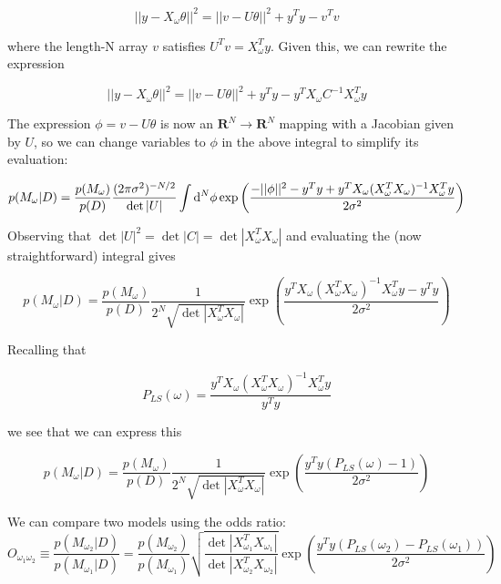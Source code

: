 \documentclass[12pt,pdftex]{article}
\begin{document}
\begin{equation}
  ||y - X_\omega\theta||^2 = ||v - U\theta||^2 + y^Ty - v^Tv
\end{equation}

where the length-N array $v$ satisfies $U^Tv = X_\omega^Ty$. Given this, we can rewrite the expression

\begin{equation}
  ||y - X_\omega\theta||^2 = ||v - U\theta||^2 + y^Ty - y^TX_\omega C^{-1}X_\omega^Ty
\end{equation}

The expression $\phi = v - U\theta$ is now an $\mathbf{R}^N\to\mathbf{R}^N$ mapping with a Jacobian given by $U$, so we can change variables to $\phi$ in the above integral to simplify its evaluation:

\begin{equation}
  p(M_\omega|D) = \frac{p(M_\omega)}{p(D)}\frac{(2\pi\sigma^2)^{-N/2}}{\det|U|}
\int{\rm d}^N\phi\exp\left(\frac{-||\phi||^2 - y^Ty + y^TX_\omega(X_\omega^TX_\omega)^{-1}X_\omega^Ty}{2\sigma^2}\right)
\end{equation}

Observing that $\det|U|^2 = \det|C| = \det|X_\omega^TX_\omega|$ and evaluating the (now straightforward) integral gives

\begin{equation}
  p(M_\omega|D) = \frac{p(M_\omega)}{p(D)}\frac{1}{2^N\sqrt{\det|X_\omega^TX_\omega|}}
  \exp\left(\frac{y^TX_\omega(X_\omega^TX_\omega)^{-1}X_\omega^Ty - y^Ty}{2\sigma^2}\right)
\end{equation}

Recalling that

\begin{equation}
  P_{LS}(\omega) = \frac{y^TX_\omega(X_\omega^TX_\omega)^{-1}X_\omega^Ty}{y^Ty}
\end{equation}

we see that we can express this

\begin{equation}
  p(M_\omega|D) = \frac{p(M_\omega)}{p(D)}\frac{1}{2^N\sqrt{\det|X_\omega^TX_\omega|}}
  \exp\left(\frac{y^Ty(P_{LS}(\omega) - 1)}{2\sigma^2}\right)
\end{equation}

We can compare two models using the odds ratio:
\begin{equation}
  O_{\omega_1\omega_2} \equiv \frac{p(M_{\omega_2}|D)}{p(M_{\omega_1}|D)}
  =\frac{p(M_{\omega_2})}{p(M_{\omega_1})}\sqrt{\frac{\det|X_{\omega_1}^TX_{\omega_1}|}{\det|X_{\omega_2}^TX_{\omega_2}|}}\exp\left(\frac{y^Ty(P_{LS}(\omega_2) - P_{LS}(\omega_1))}{2\sigma^2}\right)
\end{equation}
\end{document}
